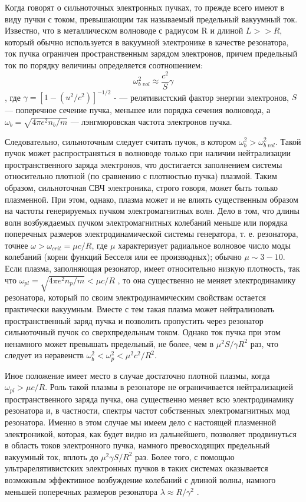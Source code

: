 \documentclass[10pt, a4paper]{article}
\begin{document}
Когда говорят о сильноточных электронных пучках, то прежде всего имеют в виду пучки с током, превышающим так называемый предельный вакуумный ток. Известно, что в металлическом волноводе с радиусом R и длиной $L >> R$, который обычно используется в вакуумной электронике в качестве резонатора, ток пучка ограничен пространственным зарядом электронов, причем предельный ток по порядку величины определяется соотношением:
\begin{equation}
	\omega_{b \; vol}^{2} \approx \frac{c^{2}}{S} \gamma
\end{equation}
, где $\gamma = [1-(u^{2}/c^{2})]^{-1/2}$ - — релятивистский фактор энергии электронов, $S$ — поперечное сечение пучка, меньшее или порядка сечения волновода, а $\omega_{b}=\sqrt{4\pi e^{2} n_{b} /m}$ — лэнгмюровская частота электронов пучка. 


Следовательно, сильноточным следует считать пучок, в котором $\omega_{b}^{2}>\omega_{b\;vol}^{2}$. Такой пучок может распространяться в волноводе только при наличии нейтрализации пространственного заряда электронов, что достигается заполнением системы относительно плотной (по сравнению с плотностью пучка) плазмой. Таким образом, сильноточная СВЧ электроника, строго говоря, может быть только плазменной. При этом, однако, плазма может и не влиять существенным образом на частоты генерируемых пучком электромагнитных волн. Дело в том, что длины волн возбуждаемых пучком электромагнитных колебаний меньше или порядка поперечных размеров электродинамической системы генератора, т. е. резонатора, точнее $\omega>\omega_{crit}= \mu c/R$, где $\mu$ характеризует радиальное волновое число моды колебаний (корни функций Бесселя или ее производных); обычно $\mu \sim 3-10$. Если плазма, заполняющая резонатор, имеет относительно низкую плотность, так что $\omega_{pl}=\sqrt{4\pi e^{2} n_{p} /m} < \mu c/R$ , то она существенно не меняет электродинамику резонатора, который по своим электродинамическим свойствам остается практически вакуумным. Вместе с тем такая плазма может нейтрализовать пространственный заряд пучка и позволить пропустить через резонатор сильноточный пучок со сверхпредельным током. Однако ток пучка при этом ненамного может превышать предельный, не более, чем в $\mu^{2} S/\gamma R^{2}$ раз, что следует из неравенств $\omega_{b}^{2}<\omega_{p}^{2}<\mu^{2} c^{2}/R^{2}$.

Иное положение имеет место в случае достаточно плотной плазмы, когда $\omega_{pl}>\mu c/R$. Роль такой плазмы в резонаторе не ограничивается нейтрализацией пространственного заряда пучка, она существенно меняет всю электродинамику резонатора и, в частности, спектры частот собственных электромагнитных мод резонатора. Именно в этом случае мы имеем дело с настоящей плазменной электроникой, которая, как будет видно из дальнейшего, позволяет продвинуться в область токов электронного пучка, намного превосходящих предельный вакуумный ток, вплоть до $\mu^{2}\gamma S/R^{2}$ раз. Более того, с помощью ультрарелятивистских электронных пучков в таких системах оказывается возможным эффективное возбуждение колебаний с длиной волны, намного меньшей поперечных размеров резонатора $\lambda \approx R/\gamma^{2}$ .
\end{document}
